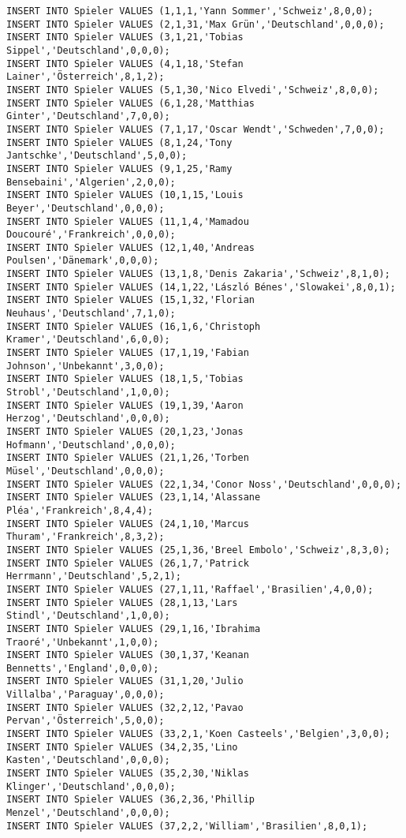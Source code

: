 \documentclass{lehramt-informatik-aufgabe}
\begin{document}
\begin{verbatim}
INSERT INTO Spieler VALUES (1,1,1,'Yann Sommer','Schweiz',8,0,0);
INSERT INTO Spieler VALUES (2,1,31,'Max Grün','Deutschland',0,0,0);
INSERT INTO Spieler VALUES (3,1,21,'Tobias Sippel','Deutschland',0,0,0);
INSERT INTO Spieler VALUES (4,1,18,'Stefan Lainer','Österreich',8,1,2);
INSERT INTO Spieler VALUES (5,1,30,'Nico Elvedi','Schweiz',8,0,0);
INSERT INTO Spieler VALUES (6,1,28,'Matthias Ginter','Deutschland',7,0,0);
INSERT INTO Spieler VALUES (7,1,17,'Oscar Wendt','Schweden',7,0,0);
INSERT INTO Spieler VALUES (8,1,24,'Tony Jantschke','Deutschland',5,0,0);
INSERT INTO Spieler VALUES (9,1,25,'Ramy Bensebaini','Algerien',2,0,0);
INSERT INTO Spieler VALUES (10,1,15,'Louis Beyer','Deutschland',0,0,0);
INSERT INTO Spieler VALUES (11,1,4,'Mamadou Doucouré','Frankreich',0,0,0);
INSERT INTO Spieler VALUES (12,1,40,'Andreas Poulsen','Dänemark',0,0,0);
INSERT INTO Spieler VALUES (13,1,8,'Denis Zakaria','Schweiz',8,1,0);
INSERT INTO Spieler VALUES (14,1,22,'László Bénes','Slowakei',8,0,1);
INSERT INTO Spieler VALUES (15,1,32,'Florian Neuhaus','Deutschland',7,1,0);
INSERT INTO Spieler VALUES (16,1,6,'Christoph Kramer','Deutschland',6,0,0);
INSERT INTO Spieler VALUES (17,1,19,'Fabian Johnson','Unbekannt',3,0,0);
INSERT INTO Spieler VALUES (18,1,5,'Tobias Strobl','Deutschland',1,0,0);
INSERT INTO Spieler VALUES (19,1,39,'Aaron Herzog','Deutschland',0,0,0);
INSERT INTO Spieler VALUES (20,1,23,'Jonas Hofmann','Deutschland',0,0,0);
INSERT INTO Spieler VALUES (21,1,26,'Torben Müsel','Deutschland',0,0,0);
INSERT INTO Spieler VALUES (22,1,34,'Conor Noss','Deutschland',0,0,0);
INSERT INTO Spieler VALUES (23,1,14,'Alassane Pléa','Frankreich',8,4,4);
INSERT INTO Spieler VALUES (24,1,10,'Marcus Thuram','Frankreich',8,3,2);
INSERT INTO Spieler VALUES (25,1,36,'Breel Embolo','Schweiz',8,3,0);
INSERT INTO Spieler VALUES (26,1,7,'Patrick Herrmann','Deutschland',5,2,1);
INSERT INTO Spieler VALUES (27,1,11,'Raffael','Brasilien',4,0,0);
INSERT INTO Spieler VALUES (28,1,13,'Lars Stindl','Deutschland',1,0,0);
INSERT INTO Spieler VALUES (29,1,16,'Ibrahima Traoré','Unbekannt',1,0,0);
INSERT INTO Spieler VALUES (30,1,37,'Keanan Bennetts','England',0,0,0);
INSERT INTO Spieler VALUES (31,1,20,'Julio Villalba','Paraguay',0,0,0);
INSERT INTO Spieler VALUES (32,2,12,'Pavao Pervan','Österreich',5,0,0);
INSERT INTO Spieler VALUES (33,2,1,'Koen Casteels','Belgien',3,0,0);
INSERT INTO Spieler VALUES (34,2,35,'Lino Kasten','Deutschland',0,0,0);
INSERT INTO Spieler VALUES (35,2,30,'Niklas Klinger','Deutschland',0,0,0);
INSERT INTO Spieler VALUES (36,2,36,'Phillip Menzel','Deutschland',0,0,0);
INSERT INTO Spieler VALUES (37,2,2,'William','Brasilien',8,0,1);

\end{verbatim}
\end{document}
